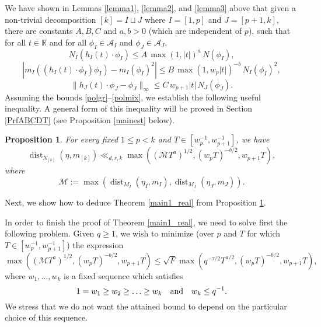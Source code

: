 \documentclass[11pt,reqno,a4paper]{amsart}
\numberwithin{equation}{section}
\newcommand{\cA}{\mathcal{A}}
\DeclareMathOperator{\dist}{dist}
\theoremstyle{theorem}
\newtheorem{proposition}[theorem]{Proposition}
\theoremstyle{definition}
\begin{document}
We have shown in Lemmas \ref{lemma1}, \ref{lemma2}, and \ref{lemma3} above that 
given a non-trivial decomposition $[k]=I\sqcup J$ where $I=[1,p]$ and $J=[p+1,k]$, 
there are constants $A, B, C$ and $a, b > 0$ (which 
are independent of $p$), such that for all $t\in\mathbb{R}$ and for all $\phi_I \in \cA_I$ and $\phi_J \in \cA_J$,
\begin{equation}
\label{polgr}
N_I(h_I(t) \cdot \phi_I) \leq A\, \max(1,|t|)^a \, N(\phi_I),
\end{equation}
\begin{equation}
\label{polmix}
|m_I((h_I(t) \cdot \phi_I) \phi_I) - m_I(\phi_I)^2| \leq B\, \max(1,w_p |t|)^{-b} \, N_I(\phi_I)^2,
\end{equation}
\begin{equation}
\label{polmix}
\|h_J(t) \cdot \phi_J - \phi_J\|_\infty \leq C\, w_{p+1} |t|  \, N_J(\phi_J).
\end{equation}
Assuming the bounds \eqref{polgr}--\eqref{polmix},
we establish the following useful inequality.
A general form of this inequality  will be proved in Section \ref{PrfABCDT}
(see Proposition \ref{mainest} below). 

\begin{proposition}
\label{mainineq}
For every fixed $1 \leq p < k$ and $T \in [w_p^{-1},w_{p+1}^{-1}]$, we have
\begin{equation}
\dist_{N_{[k]}}(\eta,m_{[k]}) \ll_{d,r,k} \max((\mathcal{M}T^a)^{1/2},(w_p T)^{-b/2},w_{p+1} T),
\end{equation}
where
\[
\mathcal{M} := \max(\dist_{M_I}(\eta_I,m_I),\dist_{M_J}(\eta_J,m_J)).
\]
\end{proposition}

Next, we show
how to deduce Theorem \ref{main1_real} from Proposition \ref{mainineq}.

In order to finish the proof of Theorem \ref{main1_real},
we need to solve first the following problem. Given $q \geq 1$, we wish to minimize (over $p$ and $T$ for
which $T\in [w_p^{-1},w_{p+1}^{-1}]$) the 
expression
\begin{equation}
\label{maxexp}
\max((\mathcal{M}T^a)^{1/2}, (w_p T)^{-b/2}, w_{p+1} T)\le \sqrt{F} \max(q^{-\tau/2} T^{a/2}, (w_p T)^{-b/2}, w_{p+1} T),
\end{equation}
where $w_1,\ldots,w_k$ is a fixed sequence which satisfies
\[
1 = w_1 \geq w_2 \geq \ldots \geq w_k\quad\hbox{and}\quad w_k\le q^{-1}.
\]
We stress that we do not want the attained bound to depend on the particular choice of this sequence. \\
\end{document}
